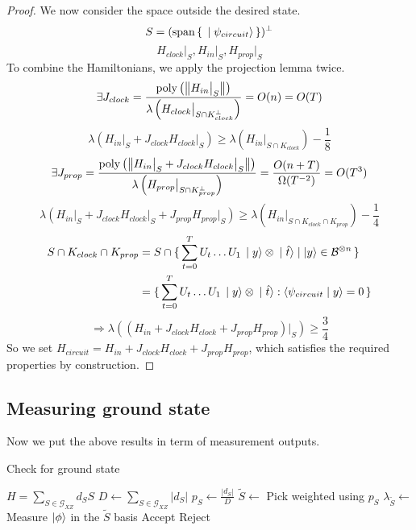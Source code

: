 \begin{proof}
We now consider the space outside the desired state.
$$S=(\operatorname*{\operatorname{span}}\set{\ket{\psi_{circuit}}})^\bot$$
$$H_{clock}\big|_S,H_{in}\big|_S,H_{prop}\big|_S$$
To combine the Hamiltonians, we apply the projection lemma twice.
$$\exists J_{clock}
=\frac{\operatorname*{\operatorname{poly}}\left(\left\lVert H_{in}\big|_S\right\rVert\right)}{\lambda\left(H_{clock}\big|_{S\cap K^\bot_{clock}}\right)}
=O(n)=O(T)$$
$$\lambda(H_{in}\big|_S+J_{clock}H_{clock}\big|_S)\geq
\lambda(H_{in}\big|_{S\cap K_{clock}})-\frac{1}{8}$$
$$\exists J_{prop}=\frac{\operatorname*{\operatorname{poly}}\left(\left\lVert H_{in}\big|_S+J_{clock}H_{clock}\big|_S\right\rVert\right)}{\lambda\left(H_{prop}\big|_{S\cap K^\bot_{prop}}\right)}
=\frac{O(n+T)}{\Omega(T^{-2})}=O(T^3)$$
$$\lambda(H_{in}\big|_S+J_{clock}H_{clock}\big|_S+J_{prop}H_{prop}\big|_S)\geq
\lambda(H_{in}\big|_{S\cap K_{clock}\cap K_{prop}})-\frac{1}{4}$$
\begin{align*}
	S\cap K_{clock}\cap K_{prop}&=S\cap\set{\sum_{t=0}^TU_t\ldots U_1\ket{y}\otimes\ket{\hat{t}}|\ket{y}\in\mathcal{B}^{\otimes n}}\\
	&=\set{\sum_{t=0}^TU_t\ldots U_1\ket{y}\otimes\ket{\hat{t}}:\braket{\psi_{circuit}|y}=0}
\end{align*}
$$\Rightarrow\lambda((H_{in}+J_{clock}H_{clock}+J_{prop}H_{prop})\big|_S)\geq\frac{3}{4}$$
So we set $H_{circuit}=H_{in}+J_{clock}H_{clock}+J_{prop}H_{prop}$, which satisfies the required properties by construction.
\end{proof}

\subsection{Measuring ground state}

Now we put the above results in term of measurement outputs.

\begin{algorithm}
	\caption{Check for ground state}
	\label{AlgGroundStateCheck}
	\begin{algorithmic}[1]
		\Require $H=\sum_{S\in\mathcal{G}_{XZ}} d_S S$
		\State $D\gets\sum_{S\in\mathcal{G}_{XZ}}|d_S|$
		\State $p_S\gets\frac{|d_S|}{D}$
		\State $\widetilde{S}\gets$ Pick weighted using $p_S$
		\State $\lambda_{\widetilde{S}}\gets$ Measure $\ket\phi$ in the $\widetilde{S}$ basis
		\State Accept
		\Else
		\State Reject
		\EndIf
		\EndProcedure
	\end{algorithmic}
\end{algorithm}

